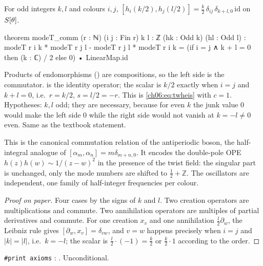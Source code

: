 \begin{theorem}\label{ch06:thm:modeTcomm}
For odd integers $k,l$ and colours $i,j$,
$[h_i(k/2),h_j(l/2)]=\frac k2\,\delta_{ij}\,\delta_{k+l,0}\,\mathrm{id}$ on $S[\theta]$.
\end{theorem}
\begin{leancode}
theorem modeT_comm (r : ℕ) (i j : Fin r) {k l : ℤ} (hk : Odd k) (hl : Odd l) :
    modeT r i k * modeT r j l - modeT r j l * modeT r i k
      = (if i = j ∧ k + l = 0 then (k : ℂ) / 2 else 0) • LinearMap.id
\end{leancode}
\begin{dictionary}
Products of endomorphisms (\lean{*}) are compositions, so the left side is the commutator.
 is the identity operator; the scalar is $k/2$ exactly when $i=j$ and $k+l=0$,
i.e.\ $r=k/2$, $s=l/2=-r$.  This is \eqref{ch06:eq:twheis} with $c=1$.  Hypotheses: $k,l$ odd;
they are necessary, because for even $k$ the junk value $0$ would make the left side $0$ while the
right side would not vanish at $k=-l\ne 0$ even.  Same as the textbook statement.
\end{dictionary}

\begin{physics}
This is the canonical commutation relation of the antiperiodic boson, the half-integral analogue of $[\alpha_m,\alpha_n]=m\delta_{m+n,0}$. It encodes the double-pole OPE $h(z)h(w)\sim 1/(z-w)^2$ in the presence of the twist field: the singular part is unchanged, only the mode numbers are shifted to $\tfrac12+\mathbb Z$. The oscillators are independent, one family of half-integer frequencies per colour.
\end{physics}
\begin{proof}[Proof on paper]
Four cases by the signs of $k$ and $l$.  Two creation operators are multiplications and commute.
Two annihilation operators are multiples of partial derivatives and commute.  For one creation
$x_{v}$ and one annihilation $\frac l2\partial_{w}$, the Leibniz rule gives
$[\partial_w,x_v]=\delta_{vw}$, and $v=w$ happens precisely when $i=j$ and $|k|=|l|$, i.e.\ $k=-l$;
the scalar is $\frac l2\cdot(-1)=\frac k2$ or $\frac k2\cdot 1$ according to the order.
\end{proof}
\begin{status}
\texttt{\#print axioms} : .  Unconditional.
\end{status}

